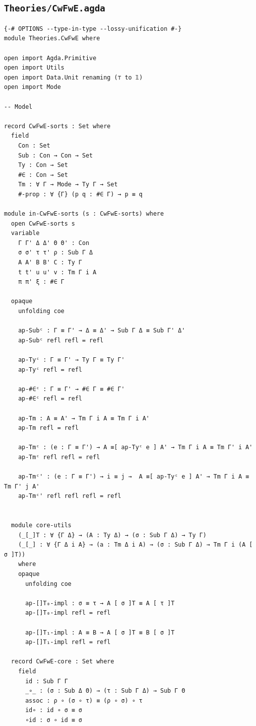 \subsection*{\texttt{Theories/CwFwE.agda}}
{\agdafont\begin{Verbatim}[breaklines=true,breakanywhere=true,fontsize=\scriptsize]
{-# OPTIONS --type-in-type --lossy-unification #-}
module Theories.CwFwE where

open import Agda.Primitive
open import Utils
open import Data.Unit renaming (⊤ to 𝟙)
open import Mode

-- Model

record CwFwE-sorts : Set where
  field
    Con : Set
    Sub : Con → Con → Set
    Ty : Con → Set
    #∈ : Con → Set
    Tm : ∀ Γ → Mode → Ty Γ → Set
    #-prop : ∀ {Γ} (p q : #∈ Γ) → p ≡ q

module in-CwFwE-sorts (s : CwFwE-sorts) where
  open CwFwE-sorts s
  variable
    Γ Γ' Δ Δ' Θ Θ' : Con
    σ σ' τ τ' ρ : Sub Γ Δ
    A A' B B' C : Ty Γ
    t t' u u' v : Tm Γ i A
    π π' ξ : #∈ Γ

  opaque
    unfolding coe

    ap-Subᶜ : Γ ≡ Γ' → Δ ≡ Δ' → Sub Γ Δ ≡ Sub Γ' Δ'
    ap-Subᶜ refl refl = refl

    ap-Tyᶜ : Γ ≡ Γ' → Ty Γ ≡ Ty Γ'
    ap-Tyᶜ refl = refl

    ap-#∈ᶜ : Γ ≡ Γ' → #∈ Γ ≡ #∈ Γ'
    ap-#∈ᶜ refl = refl

    ap-Tm : A ≡ A' → Tm Γ i A ≡ Tm Γ i A'
    ap-Tm refl = refl

    ap-Tmᶜ : (e : Γ ≡ Γ') → A ≡[ ap-Tyᶜ e ] A' → Tm Γ i A ≡ Tm Γ' i A'
    ap-Tmᶜ refl refl = refl

    ap-Tmᶜ' : (e : Γ ≡ Γ') → i ≡ j →  A ≡[ ap-Tyᶜ e ] A' → Tm Γ i A ≡ Tm Γ' j A'
    ap-Tmᶜ' refl refl refl = refl


  module core-utils
    (_[_]T : ∀ {Γ Δ} → (A : Ty Δ) → (σ : Sub Γ Δ) → Ty Γ)
    (_[_] : ∀ {Γ Δ i A} → (a : Tm Δ i A) → (σ : Sub Γ Δ) → Tm Γ i (A [ σ ]T))
    where
    opaque
      unfolding coe

      ap-[]T₀-impl : σ ≡ τ → A [ σ ]T ≡ A [ τ ]T
      ap-[]T₀-impl refl = refl
      
      ap-[]T₁-impl : A ≡ B → A [ σ ]T ≡ B [ σ ]T
      ap-[]T₁-impl refl = refl

  record CwFwE-core : Set where
    field
      id : Sub Γ Γ
      _∘_ : (σ : Sub Δ Θ) → (τ : Sub Γ Δ) → Sub Γ Θ
      assoc : ρ ∘ (σ ∘ τ) ≡ (ρ ∘ σ) ∘ τ
      id∘ : id ∘ σ ≡ σ
      ∘id : σ ∘ id ≡ σ


\end{Verbatim}}
